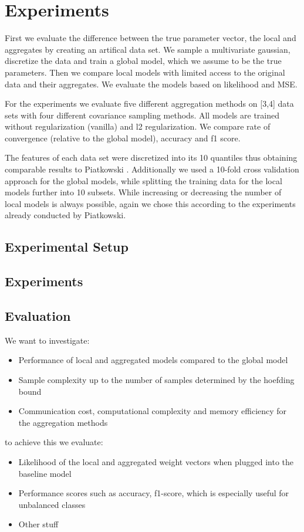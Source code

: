 
\chapter{Experiments}
\label{chapter:ch5}
First we evaluate the difference between the true parameter vector, the local and aggregates by creating an artifical data set. We sample a multivariate gaussian, discretize the data and train a global model, which we assume to be the true parameters.
Then we compare local models with limited access to the original data and their aggregates. We evaluate the models based on likelihood and MSE.

For the experiments we evaluate five different aggregation methods on [3,4] data sets with four different covariance sampling methods.
All models are trained without regularization (vanilla) and l2 regularization. 
We compare rate of convergence (relative to the global model), accuracy and f1 score.

The features of each data set were discretized into its 10 quantiles thus obtaining comparable results to Piatkowski \cite{piatkowski2019distributed}. 
Additionally we used a 10-fold cross validation approach for the global models, while splitting the training data for the local models further into 10 subsets.
While increasing or decreasing the number of local models is always possible, again we chose this according to the experiments already conducted by Piatkowski.

\section{Experimental Setup}

\section{Experiments}

\section{Evaluation}
We want to investigate:
\begin{itemize}
    \item Performance of local and aggregated models compared to the global model
    \item Sample complexity up to the number of samples determined by the hoefding bound 
    \item Communication cost, computational complexity and memory efficiency for the aggregation methods
\end{itemize}

to achieve this we evaluate:

\begin{itemize}
    \item Likelihood of the local and aggregated weight vectors when plugged into the baseline model 
    \item Performance scores such as accuracy, f1-score, which is especially useful for unbalanced classes 
    \item Other stuff 
\end{itemize}
